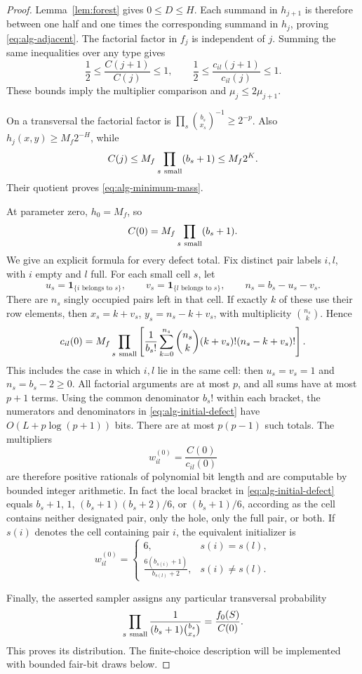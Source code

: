 \begin{proof}
Lemma~\ref{lem:forest} gives \(0\leq D\leq H\).  Each summand in
\(h_{j+1}\) is therefore between one half and one times the
corresponding summand in \(h_j\), proving
\eqref{eq:alg-adjacent}.  The factorial factor in \(f_j\) is
independent of \(j\).  Summing the same inequalities over any type
gives
\[
 \frac12\leq \frac{C(j+1)}{C(j)}\leq 1,
 \qquad
 \frac12\leq \frac{c_{il}(j+1)}{c_{il}(j)}\leq 1.
\]
These bounds imply the multiplier comparison and
\(\mu_j\leq 2\mu_{j+1}\).

On a transversal the factorial factor is
\(\prod_s\binom{b_s}{x_s}^{-1}\geq 2^{-p}\).
Also \(h_j(x,y)\geq M_f2^{-H}\), while
\[
 C(j)\leq M_f\prod_{s\ {\rm small}}(b_s+1)
 \leq M_f2^K.
\]
Their quotient proves \eqref{eq:alg-minimum-mass}.

At parameter zero, \(h_0=M_f\), so
\begin{equation}
 C(0)=M_f\prod_{s\ {\rm small}}(b_s+1).
 \label{eq:alg-initial-total}
\end{equation}
We give an explicit formula for every defect total.  Fix distinct
pair labels \(i,l\), with \(i\) empty and \(l\) full.  For each small
cell \(s\), let
\[
 u_s=\mathbf 1_{\{i\text{ belongs to }s\}},\qquad
 v_s=\mathbf 1_{\{l\text{ belongs to }s\}},\qquad
 n_s=b_s-u_s-v_s.
\]
There are \(n_s\) singly occupied pairs left in that cell.  If exactly
\(k\) of these use their row elements, then
\(x_s=k+v_s\), \(y_s=n_s-k+v_s\), with multiplicity
\(\binom{n_s}{k}\).  Hence
\begin{equation}
 c_{il}(0)
 =M_f\prod_{s\ {\rm small}}
 \left[
 \frac{1}{b_s!}
 \sum_{k=0}^{n_s}
 \binom{n_s}{k}(k+v_s)!(n_s-k+v_s)!
 \right].
 \label{eq:alg-initial-defect}
\end{equation}
This includes the case in which \(i,l\) lie in the same cell:
then \(u_s=v_s=1\) and \(n_s=b_s-2\geq 0\).
All factorial arguments are at most \(p\), and all sums have at most
\(p+1\) terms.  Using the common denominator \(b_s!\) within each
bracket, the numerators and denominators in
\eqref{eq:alg-initial-defect} have
\(O(L+p\log(p+1))\) bits.  There are at most \(p(p-1)\) such
totals.  The multipliers
\[
 w_{il}^{(0)}=\frac{C(0)}{c_{il}(0)}
\]
are therefore positive rationals of polynomial bit length and are
computable by bounded integer arithmetic.
In fact the local bracket in \eqref{eq:alg-initial-defect} equals
\(b_s+1\), \(1\), \((b_s+1)(b_s+2)/6\), or
\((b_s+1)/6\), according as the cell contains neither designated
pair, only the hole, only the full pair, or both.  If \(s(i)\)
denotes the cell containing pair \(i\), the equivalent initializer is
\[
 w_{il}^{(0)}
 =
 \begin{cases}
 6,&s(i)=s(l),\\[2mm]
 \displaystyle\frac{6(b_{s(i)}+1)}{b_{s(l)}+2},
       &s(i)\ne s(l).
 \end{cases}
\]

Finally, the asserted sampler assigns any particular transversal
probability
\[
 \prod_{s\ {\rm small}}
 \frac{1}{(b_s+1)\binom{b_s}{x_s}}
 =\frac{f_0(S)}{C(0)}.
\]
This proves its distribution.  The finite-choice description will be
implemented with bounded fair-bit draws below.
\end{proof}

